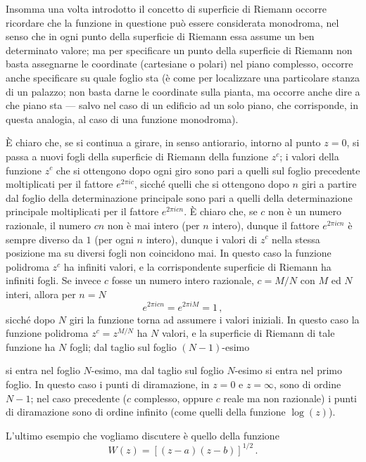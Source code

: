 \documentclass[11pt, a4paper]{book}
\numberwithin{equation}{section}
\begin{document}
Insomma una volta introdotto il concetto di superficie di Riemann occorre ricordare che la funzione in questione può essere considerata monodroma, nel senso che in ogni punto della superficie di Riemann essa assume un ben determinato valore; ma per specificare un punto della superficie di Riemann non basta assegnarne le coordinate (cartesiane o polari) nel piano complesso, occorre anche specificare su quale foglio sta (è come per localizzare una particolare stanza di un palazzo; non basta darne le coordinate sulla pianta, ma occorre anche dire a che piano sta — salvo nel caso di un edificio ad un solo piano, che corrisponde, in questa analogia, al caso di una funzione monodroma).

È chiaro che, se si continua a girare, in senso antiorario, intorno al punto $z=0$, si passa a nuovi fogli della superficie di Riemann della funzione $z^c$; i valori della funzione $z^c$ che si ottengono dopo ogni giro sono pari a quelli sul foglio precedente moltiplicati per il fattore $e^{2\pi ic}$, sicché quelli che si ottengono dopo $n$ giri a partire dal foglio della determinazione principale sono pari a quelli della determinazione principale moltiplicati per il fattore $e^{2\pi icn}$. È chiaro che, se $c$ non è un numero razionale, il numero $cn$ non è mai intero (per $n$ intero), dunque il fattore $e^{2\pi icn}$ è sempre diverso da $1$ (per ogni $n$ intero), dunque i valori di $z^c$ nella stessa posizione ma su diversi fogli non coincidono mai. In questo caso la funzione polidroma $z^c$ ha infiniti valori, e la corrispondente superficie di Riemann ha infiniti fogli. Se invece $c$ fosse un numero intero razionale, $c = M/N$ con $M$ ed $N$ interi, allora per $n=N$
\begin{equation}
e^{2\pi icn} = e^{2\pi iM} = 1\,, \tag{13}
\end{equation}
sicché dopo $N$ giri la funzione torna ad assumere i valori iniziali. In questo caso la funzione polidroma $z^c = z^{M/N}$ ha $N$ valori, e la superficie di Riemann di tale funzione ha $N$ fogli; dal taglio sul foglio $(N-1)$-esimo%

si entra nel foglio $N$-esimo, ma dal taglio sul foglio $N$-esimo si entra nel
primo foglio. In questo caso i punti di diramazione, in $z=0$ e $z=\infty$, sono
di ordine $N-1$; nel caso precedente ($c$ complesso, oppure $c$ reale ma
non razionale) i punti di diramazione sono di ordine infinito (come quelli
della funzione $\log(z)$).

L'ultimo esempio che vogliamo discutere è quello della funzione
\begin{equation}
    W(z) = \left[(z-a)(z-b)\right]^{1/2} \,.
    \tag{14}
\end{equation}
\end{document}
